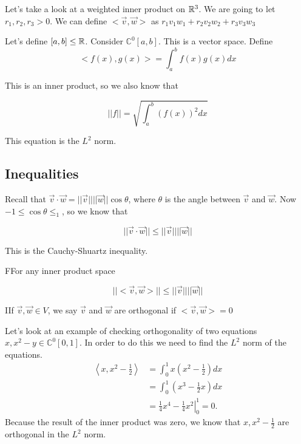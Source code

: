 	Let's take a look at a weighted inner product on $\mathbb{R}^3$. We are going to let $r_1,r_2,r_3>0$. We can define $<\vec{v},\vec{w}>$ as $r_1v_1w_1+r_2v_2w_2+r_3v_3w_3$

	\begin{problem}
		Let's define $[a,b]\le\mathbb{R}$. Consider $\mathbb{C}^0[a,b]$. This is a vector space. Define 
		\begin{equation}
			<f(x),g(x)> = \int_a^bf(x)g(x)dx
		\end{equation}

		This is an inner product, so we also know that

		\begin{equation}
			| | f | | = \sqrt{\int_a^b\left(f(x)\right)^2dx}
		\end{equation}

		This equation is the $L^2$ norm.
	\end{problem}

\subsection{Inequalities}

	Recall that $\vec{v}\cdot\vec{w} = | | \vec{v} | | | | \vec{w} | |\cos\theta$, where $\theta$ is the angle between $\vec{v}$ and $\vec{w}$. Now $-1\le\cos\theta\le_1$, so we know that 
	
	\begin{equation}
		| | \vec{v}\cdot\vec{w} | | \le | | \vec{v} | | | | \vec{w} | |
	\end{equation}

	This is the Cauchy-Shuartz inequality.

	\begin{theorem}
		FFor any inner product space

		\begin{equation}
			||<\vec{v},\vec{w}>||\le | | \vec{v}  | | | | \vec{w} | |
		\end{equation}
	\end{theorem}

	\begin{definition}
		IIf $\vec{v},\vec{w}\in V$, we say $\vec{v}$ and $\vec{w}$ are orthogonal if $<\vec{v},\vec{w}> = 0$
	\end{definition}

	\begin{problem}
		Let's look at an example of checking orthogonality of two equations $x,x^2-y\in\mathbb{C}^0[0,1]$. In order to do this we need to find the $L^2$ norm of the equations.
		\begin{align*}
			\left<x,x^2-\frac{1}{2}\right> &= \int_0^1x\left(x^2-\frac{1}{2}\right)dx\\
					    &=\int_0^1\left(x^3-\frac{1}{2}x\right)dx\\
					    &=\left.\frac{1}{4}x^4-\frac{1}{4}x^2\right|_0^1=0
		.\end{align*}	
		Because the result of the inner product was zero, we know that $x,x^2-\frac{1}{2}$ are orthogonal in the $L^2$ norm.
	\end{problem}

